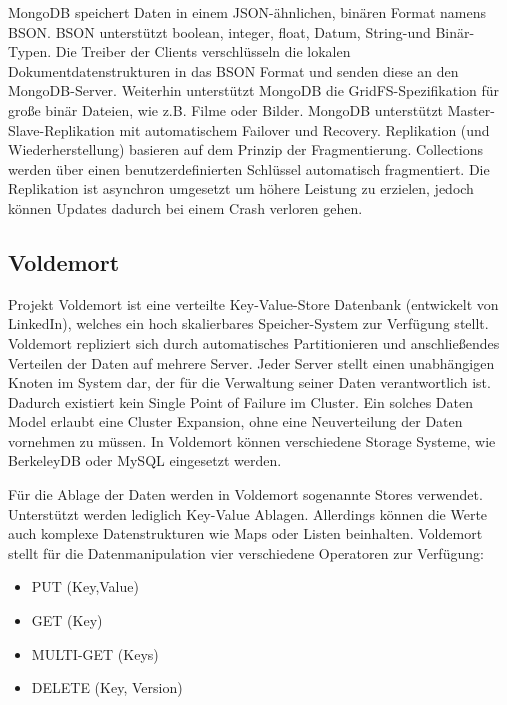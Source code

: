 MongoDB speichert Daten in einem JSON-ähnlichen, binären Format namens BSON. BSON unterstützt boolean, integer, float, Datum, String-und Binär-Typen. Die Treiber der Clients verschlüsseln die lokalen Dokumentdatenstrukturen in das BSON Format und senden diese an den MongoDB-Server. Weiterhin unterstützt MongoDB die GridFS-Spezifikation für große binär Dateien, wie z.B. Filme oder Bilder. MongoDB unterstützt Master-Slave-Replikation mit automatischem Failover und Recovery. Replikation (und Wiederherstellung) basieren auf dem Prinzip der Fragmentierung. Collections werden über einen benutzerdefinierten Schlüssel automatisch fragmentiert. Die Replikation ist asynchron umgesetzt um höhere Leistung zu erzielen, jedoch können Updates dadurch bei einem Crash verloren gehen. 

\subsection{Voldemort}
\label{ch:AnalyseDatenbanken:sec:Datenbanken:subsec:Voldemort}

Projekt Voldemort \cite{vod2013} ist eine verteilte Key-Value-Store Datenbank (entwickelt von LinkedIn), welches ein hoch skalierbares Speicher-System zur Verfügung stellt. Voldemort repliziert sich durch automatisches Partitionieren und anschließendes Verteilen der Daten auf mehrere Server. Jeder Server stellt einen unabhängigen Knoten im System dar, der für die Verwaltung seiner Daten verantwortlich ist. Dadurch existiert kein Single Point of Failure im Cluster. Ein solches Daten Model erlaubt eine Cluster Expansion, ohne eine Neuverteilung der Daten vornehmen zu müssen. In Voldemort können verschiedene Storage Systeme, wie BerkeleyDB oder MySQL eingesetzt werden. 

Für die Ablage der Daten werden in Voldemort sogenannte Stores verwendet. Unterstützt werden lediglich Key-Value Ablagen. Allerdings können die Werte auch komplexe Datenstrukturen wie Maps oder Listen beinhalten. Voldemort stellt für die Datenmanipulation vier verschiedene Operatoren zur Verfügung:

\begin{itemize}

	\item PUT (Key,Value)
	\item GET (Key)
	\item MULTI-GET (Keys)
	\item DELETE (Key, Version) 

\end{itemize}

